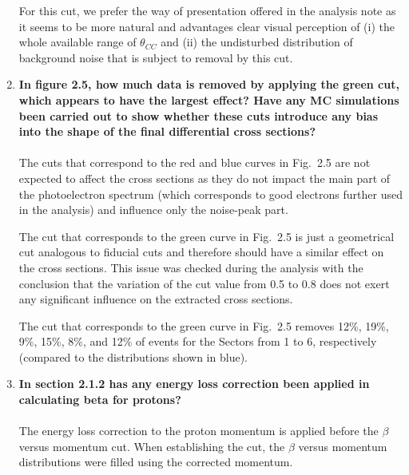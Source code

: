 \documentclass[,superscriptaddress,showpacs,amssymb,amsmath,amsfonts,linenumbers,article]{revtex4-1}
\begin{document}
\begin{enumerate}[label=\textbf{\arabic*}.]
For this cut, we prefer the way of presentation offered in the analysis note as it seems to be more natural and advantages clear visual perception of (i) the whole available range of $\theta_{CC}$ and (ii) the undisturbed distribution of background noise that is subject to removal by this cut.

\item {\bf In figure 2.5, how much data is removed by applying the green cut, which appears to have the largest effect? Have any MC simulations been carried out to show whether these cuts introduce any bias into the shape of the final differential cross sections?}\\ \\
The cuts that correspond to the red and blue curves in Fig.~2.5 are not expected to affect the cross sections as they do not impact the main part of the photoelectron spectrum (which corresponds to good electrons further used in the analysis) and influence only the noise-peak part. 

The cut that corresponds to the green curve in Fig.~2.5 is just a geometrical cut analogous to fiducial cuts and therefore should have a similar effect on the cross sections. This issue was checked during the analysis with the conclusion that the variation of the cut value from 0.5 to 0.8 does not exert any significant influence on the extracted cross sections.

The cut that corresponds to the green curve in Fig.~2.5 removes 12\%, 19\%, 9\%, 15\%, 8\%, and 12\% of events for the Sectors from 1 to 6, respectively (compared to the distributions shown in blue).


\item {\bf In section 2.1.2 has any energy loss correction been applied in calculating beta for protons?}\\ \\
The energy loss correction to the proton momentum is applied before the $\beta$ versus momentum cut. When establishing the cut, the $\beta$ versus momentum distributions were filled using the corrected momentum.


\end{enumerate}
\end{document}
